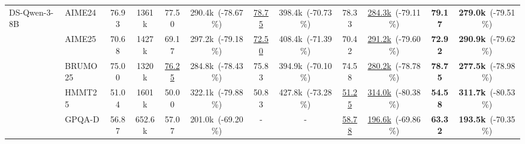 \documentclass[11pt]{article}
\theoremstyle{plain}
\begin{document}
\begin{table}[ht!]
{\begin{tabular}{llcc cc cc cc cc}
\midrule
\multirow{5}{*}{DS-Qwen-3-8B} 
& AIME24    & \cellcolor{mygreen1}76.93 & 1361k   & \cellcolor{mygreen2}77.50 & 290.4k~(-78.67\%)  & \cellcolor{mygreen2}\underline{78.75} & 398.4k~(-70.73\%) & \cellcolor{mygreen2}78.33 & \underline{284.3k}~(-79.11\%)    & \cellcolor{mygreen3}\textbf{79.17} & \textbf{279.0k}~(-79.51\%)\\
& AIME25    & \cellcolor{mygreen2}70.68 & 1427k   & \cellcolor{mygreen1}69.17 & 297.2k~(-79.18\%)  & \cellcolor{mygreen2}\underline{72.50} & 408.4k~(-71.39\%) & \cellcolor{mygreen2}70.42 & \underline{291.2k}~(-79.60\%)    & \cellcolor{mygreen3}\textbf{72.92} & \textbf{290.9k}~(-79.62\%)\\
& BRUMO25   & \cellcolor{mygreen2}75.00 & 1320k   & \cellcolor{mygreen2}\underline{76.25} & 284.8k~(-78.43\%)  & \cellcolor{mygreen2}75.83 & 394.9k~(-70.10\%) & \cellcolor{mygreen1}74.58 & \underline{280.2k}~(-78.78\%)    & \cellcolor{mygreen3}\textbf{78.75} & \textbf{277.5k}~(-78.98\%)\\
& HMMT25    & \cellcolor{mygreen2}51.04 & 1601k   & \cellcolor{mygreen1}50.00 & 322.1k~(-79.88\%)  & \cellcolor{mygreen1}50.83 & 427.8k~(-73.28\%) & \cellcolor{mygreen2}\underline{51.25} & \underline{314.0k}~(-80.38\%)    & \cellcolor{mygreen3}\textbf{54.58} & \textbf{311.7k}~(-80.53\%)\\
& GPQA-D    & \cellcolor{mygreen1}56.87 & 652.6k  & \cellcolor{mygreen2}57.07 & 201.0k~(-69.20\%)  & - & - & \cellcolor{mygreen2}\underline{58.78} & \underline{196.6k}~(-69.86\%)    & \cellcolor{mygreen3}\textbf{63.32} & \textbf{193.5k}~(-70.35\%)\\


\end{tabular}}
\end{table}
\end{document}

